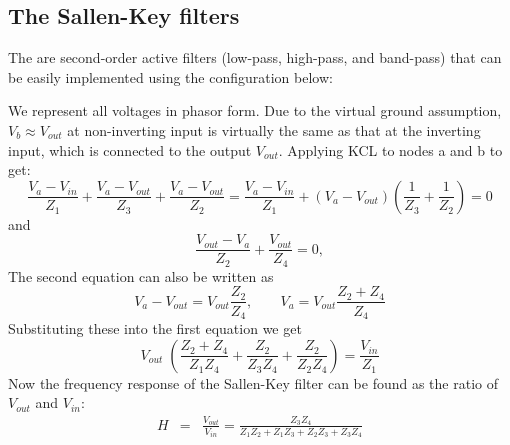 \begin{comment}
\[
\frac{V_{in}-V}{R_1}+\frac{V_{out}-V}{R_2}=\frac{V}{R_1}+\frac{V}{1/j\omega C_2}
\;\;\;\;\mbox{i.e.,}\;\;\;\;
\frac{V_{in}}{R_1}+\frac{V_{out}}{R_2}=\left( \frac{2}{R_1}+\frac{1}{R_2}+j\omega C_2 \right)V
\]
\[
\frac{V}{R_1}+\frac{V_{out}}{1/j\omega C_1}=0,\;\;\;\;\mbox{i.e.,}\;\;\;\;
V=-j\omega R_1C_1 V_{out}
\]
Substitute into the first equation:
\[
\frac{V_{in}}{R_1}+\frac{V_{out}}{R_2}
=-\left( \frac{2}{R_1}+\frac{1}{R_2}+j\omega C_2 \right)j\omega R_1C_1 V_{out}
=-\left( j\omega C_1 \left(\frac{2R_2+R_1}{R_2}\right)+(j\omega)^2 R_1C_1C_2 \right)V_{out}
\]
Rearrange:
\begin{eqnarray}
\frac{V_{in}}{R_1}&=&-\left(\frac{1}{R_2}+j\omega C_1\left(\frac{2R_2+R_1}{R_2}\right)+(j\omega)^2 R_1C_1C_2 \right)V_{out}
\nonumber\\
&=&-R_1C_1C_2\left(\frac{1}{R_1R_2C_1C_2}
+j\omega \left(\frac{2R_2+R_1}{R_1R_2C_2}\right)+(j\omega)^2 \right)V_{out}
\nonumber
\end{eqnarray}
Now we can find the FRF:
\[
H(j\omega)=\frac{V_{out}}{V_{in}}
=-\frac{1}{R_1^2C_1C_2}\;\;\frac{1}{(j\omega)^2+j\omega \omega_n/Q+\omega_n^2}
\]
where
\[
\omega_n=\frac{1}{\sqrt{R_1R_2C_1C_2}},\;\;\;\;
\frac{2R_2+R_1}{R_1R_2C_2}=\frac{\omega_n}{Q}=\Delta\omega,\;\;\;\mbox{i.e.,}\;\;\;
Q=\omega_n\frac{R_1R_2C_2}{2R_2+R_1}=\frac{\sqrt{R_1R_2C_1C_2}}{C_1(2R_2+R_1)}
\]
This is a 2nd-order low-pass filter, when $\omega=0$, we have
\[
H(j\omega)\big|_{\omega=0}=H(j0)=-\frac{1}{R_1^2C_1C_2}\;\frac{1}{\omega_n^2}
=-\frac{R_1R_2C_1C_2}{R_1^2C_1C_2}=-\frac{R_2}{R_1}
\]
\end{comment}

\subsection{The Sallen-Key filters}

The
are second-order active filters (low-pass, high-pass, and band-pass) that 
can be easily implemented using the configuration below:


We represent all voltages in phasor form. Due to the virtual ground 
assumption, $V_b\approx V_{out}$ at non-inverting input is virtually 
the same as that at the inverting input, which is connected to the 
output $V_{out}$. Applying KCL to nodes a and b to get:
\[ 
\frac{V_a-V_{in}}{Z_1}+\frac{V_a-V_{out}}{Z_3}+\frac{V_a-V_{out}}{Z_2}
=\frac{V_a-V_{in}}{Z_1}+(V_a-V_{out})\left(\frac{1}{Z_3}+\frac{1}{Z_2}\right)=0 
\]
and
\[
\frac{V_{out}-V_a}{Z_2}+\frac{V_{out}}{Z_4}=0,
\]
The second equation can also be written as
\[
V_a-V_{out}=V_{out}\frac{Z_2}{Z_4}, \;\;\;\;\;\;\;V_a=V_{out}\frac{Z_2+Z_4}{Z_4}
\]
Substituting these into the first equation we get 
\[
V_{out}\;\left(\frac{Z_2+Z_4}{Z_1Z_4}+\frac{Z_2}{Z_3Z_4}+\frac{Z_2}{Z_2Z_4} \right)
=\frac{V_{in}}{Z_1}
\]
Now the frequency response of the Sallen-Key filter can be found as
the ratio of $V_{out}$ and $V_{in}$:
\begin{eqnarray}  
  H&=&\frac{V_{out}}{V_{in}}=\frac{Z_3Z_4}{Z_1Z_2+Z_1Z_3+Z_2Z_3+Z_3Z_4} 
\nonumber
\end{eqnarray}

